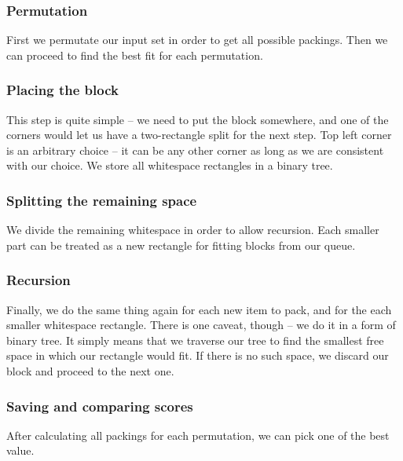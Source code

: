 \subsubsection{Permutation}
First we permutate our input set in order to get all possible packings.
Then we can proceed to find the best fit for each permutation.

\subsubsection{Placing the block}
This step is quite simple -- we need to put the block somewhere,
and one of the corners would let us have a two-rectangle split for the next step.
Top left corner is an arbitrary choice -- it can be any other corner as long
as we are consistent with our choice.
We store all whitespace rectangles in a binary tree.

\subsubsection{Splitting the remaining space}
We divide the remaining whitespace in order to allow recursion.
Each smaller part can be treated as a new rectangle
for fitting blocks from our queue.

\subsubsection{Recursion}
Finally, we do the same thing again for each new item to pack,
and for the each smaller whitespace rectangle.
There is one caveat, though -- we do it in a form of binary tree.
It simply means that we traverse our tree to find the smallest free space
in which our rectangle would fit.
If there is no such space, we discard our block and proceed to the next one.

\subsubsection{Saving and comparing scores}
After calculating all packings for each permutation,
we can pick one of the best value.

